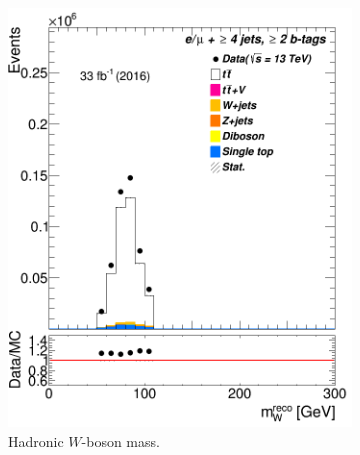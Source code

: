 \begin{figure}
\begin{subfigure}{0.35\textwidth}
		\includegraphics[width=\linewidth]{ControlPlots_emujets_2016_4incl_2incl/klf_original_Whad_m_emujets_2016.png}
		\caption{Hadronic $W$-boson mass.} \label{fig:18}
	\end{subfigure}
	\medskip	
	\begin{subfigure}{0.35\textwidth}

\end{subfigure}
\end{figure}
